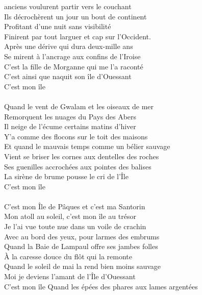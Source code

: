 
 anciens voulurent partir vers le couchant
\\Ils décrochèrent un jour un bout de continent
\\Profitant d’une nuit sans visibilité
\\Finirent par tout larguer et cap sur l’Occident.
\\Après une dérive qui dura deux-mille ans
\\Se mirent à l’ancrage aux confins de l’Iroise
\\C’est la fille de Morganne qui me l’a raconté
\\C’est ainsi que naquit son île d’Ouessant
\\C’est mon île \bissimple
\\\\Quand le vent de Gwalam et les oiseaux de mer
\\Remorquent les nuages du Pays des Abers
\\Il neige de l’écume certains matins d’hiver
\\Y’a comme des flocons sur le toit des maisons
\\Et quand le mauvais temps comme un bélier sauvage
\\Vient se briser les cornes aux dentelles des roches
\\Ses guenilles accrochées aux pointes des balises
\\La sirène de brume pousse le cri de l’Île
\\C’est mon île \bissimple
\\\\C’est mon Île de Pâques et c'est ma Santorin
\\Mon atoll au soleil, c’est mon île au trésor
\\Je l’ai vue toute nue dans un voile de crachin
\\Avec au bord des yeux, pour larmes des embrums
\\Quand la Baie de Lampaul offre ses jambes folles
\\À la caresse douce du flôt qui la remonte
\\Quand le soleil de mai la rend bien moins sauvage
\\Moi je deviens l’amant de l’Île d’Ouessant
\\C’est mon île \bissimple
\breakpage
Quand les épées des phares aux lames argentées
